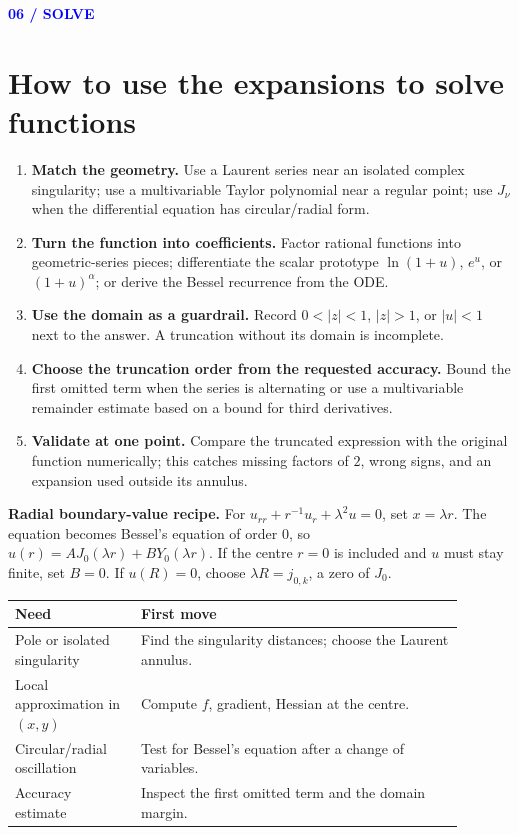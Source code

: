 \documentclass[11pt]{article}
\newcommand{\sectiontag}[1]{\textcolor{blue}{\sffamily\footnotesize\bfseries #1}\par\vspace{2pt}}
\begin{document}
\sectiontag{06 / SOLVE}\section*{How to use the expansions to solve functions}
\begin{enumerate}[leftmargin=*,itemsep=6pt]
\item \textbf{Match the geometry.} Use a Laurent series near an isolated complex singularity; use a multivariable Taylor polynomial near a regular point; use $J_\nu$ when the differential equation has circular/radial form.
\item \textbf{Turn the function into coefficients.} Factor rational functions into geometric-series pieces; differentiate the scalar prototype $\ln(1+u)$, $e^u$, or $(1+u)^\alpha$; or derive the Bessel recurrence from the ODE.
\item \textbf{Use the domain as a guardrail.} Record $0<|z|<1$, $|z|>1$, or $|u|<1$ next to the answer. A truncation without its domain is incomplete.
\item \textbf{Choose the truncation order from the requested accuracy.} Bound the first omitted term when the series is alternating or use a multivariable remainder estimate based on a bound for third derivatives.
\item \textbf{Validate at one point.} Compare the truncated expression with the original function numerically; this catches missing factors of $2$, wrong signs, and an expansion used outside its annulus.
\end{enumerate}
\begin{orangebox}
\textbf{Radial boundary-value recipe.} For $u_{rr}+r^{-1}u_r+\lambda^2u=0$, set $x=\lambda r$. The equation becomes Bessel's equation of order $0$, so $u(r)=A J_0(\lambda r)+B Y_0(\lambda r)$. If the centre $r=0$ is included and $u$ must stay finite, set $B=0$. If $u(R)=0$, choose $\lambda R=j_{0,k}$, a zero of $J_0$.
\end{orangebox}
\begin{center}
\begin{tabular}{p{0.25\linewidth} p{0.64\linewidth}}
\toprule\textbf{Need} & \textbf{First move}\\\midrule
Pole or isolated singularity & Find the singularity distances; choose the Laurent annulus.\\
Local approximation in $(x,y)$ & Compute $f$, gradient, Hessian at the centre.\\
Circular/radial oscillation & Test for Bessel's equation after a change of variables.\\
Accuracy estimate & Inspect the first omitted term and the domain margin.\\
\bottomrule
\end{tabular}
\end{center}
\end{document}
